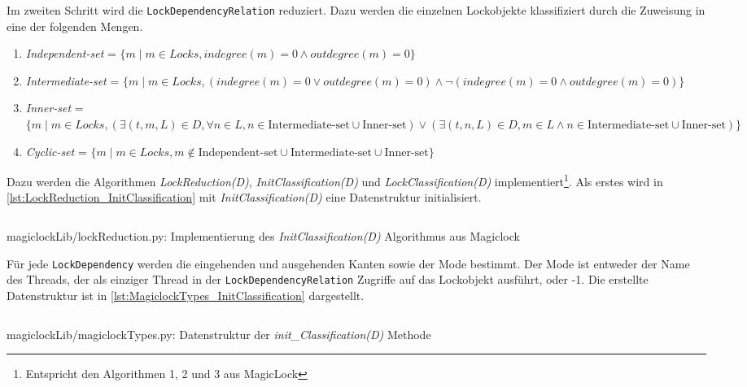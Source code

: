 Im zweiten Schritt wird die \texttt{Lock\-Dependency\-Relation} reduziert. Dazu
werden die einzelnen Lockobjekte klassifiziert durch die Zuweisung in eine der
folgenden Mengen.\autocite[4]{MagicLock}
\begin{enumerate}
  \item \emph{Independent-set} = $\{m \mid m \in Locks, indegree(m) = 0 \land
  outdegree(m) = 0\}$
  \item \emph{Intermediate-set} = $\{m \mid m \in Locks, (indegree(m) = 0 \lor
  outdegree(m) = 0) \land \lnot (indegree(m) = 0 \land outdegree(m) = 0)\}$
  \item \emph{Inner-set} = $\{m \mid m \in Locks, (\exists (t,m,L) \in D,
  \forall n \in L, n \in \text{Intermediate-set} \cup \text{Inner-set}) \lor
  (\exists (t,n,L) \in D, m \in L \land n \in \text{Intermediate-set} \cup
  \text{Inner-set})\}$
  \item \emph{Cyclic-set} = $\{m \mid m \in Locks, m \notin
  \text{Independent-set} \cup \text{Intermediate-set} \cup \text{Inner-set}\}$
\end{enumerate}
Dazu werden die Algorithmen \emph{LockReduction(D)},
\emph{InitClassification(D)} und \emph{LockClassification(D)}
implementiert\footnote{Entspricht den Algorithmen 1, 2 und 3 aus
MagicLock\autocite[5]{MagicLock}}. Als erstes wird in
\cref{lst:LockReduction_InitClassification} mit \emph{InitClassification(D)}
eine Datenstruktur initialisiert.
\begin{listing}[ht]
  \inputminted[frame=lines,linenos,firstline=17,lastline=32]{python}{./Python/magiclockLib/lockReduction.py}
  \caption{magiclockLib/lockReduction.py: Implementierung des \emph{InitClassification(D)} Algorithmus aus Magiclock\autocite[5]{MagicLock}}
  \label{lst:LockReduction_InitClassification}
\end{listing}
Für jede \texttt{Lock\-Dependency} werden die eingehenden und ausgehenden Kanten
sowie der Mode bestimmt. Der Mode ist entweder der Name des Threads, der als
einziger Thread in der \texttt{Lock\-Dependency\-Relation} Zugriffe auf das
Lockobjekt ausführt, oder -1. Die erstellte Datenstruktur ist in
\cref{lst:MagiclockTypes_InitClassification} dargestellt.
\begin{listing}[ht]
  \inputminted[frame=lines,linenos,firstline=3,lastline=8]{python}{./Python/magiclockLib/magiclockTypes.py}
  \caption{magiclockLib/magiclockTypes.py: Datenstruktur der \emph{init\_Classification(D)} Methode}
  \label{lst:MagiclockTypes_InitClassification}
\end{listing}
